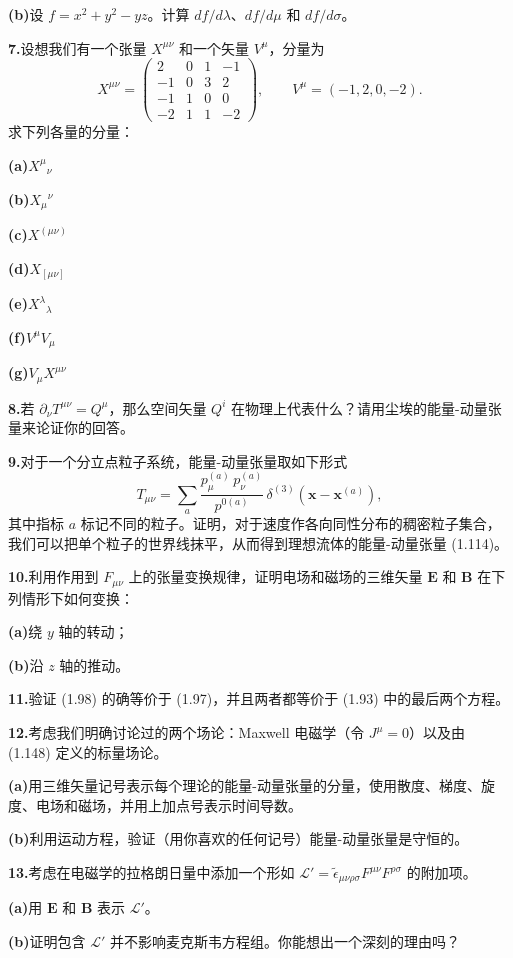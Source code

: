 \textbf{(b)}\quad 设 $f = x^{2}+y^{2}-yz$。计算 $df/d\lambda$、$df/d\mu$ 和 $df/d\sigma$。

\textbf{7.}\quad 设想我们有一个张量 $X^{\mu\nu}$ 和一个矢量 $V^{\mu}$，分量为
\begin{equation*}
X^{\mu\nu} =
\begin{pmatrix}
2 & 0 & 1 & -1\\
-1 & 0 & 3 & 2\\
-1 & 1 & 0 & 0\\
-2 & 1 & 1 & -2
\end{pmatrix},
\qquad
V^{\mu} = (-1, 2, 0, -2).
\end{equation*}
求下列各量的分量：

\textbf{(a)}\quad $X^{\mu}{}_{\nu}$

\textbf{(b)}\quad $X_{\mu}{}^{\nu}$

\textbf{(c)}\quad $X^{(\mu\nu)}$

\textbf{(d)}\quad $X_{[\mu\nu]}$

\textbf{(e)}\quad $X^{\lambda}{}_{\lambda}$

\textbf{(f)}\quad $V^{\mu}V_{\mu}$

\textbf{(g)}\quad $V_{\mu}X^{\mu\nu}$

\textbf{8.}\quad 若 $\partial_{\nu}T^{\mu\nu}=Q^{\mu}$，那么空间矢量 $Q^{i}$ 在物理上代表什么？请用尘埃的能量-动量张量来论证你的回答。

\textbf{9.}\quad 对于一个分立点粒子系统，能量-动量张量取如下形式
\begin{equation*}
T_{\mu\nu} = \sum_{a} \frac{p^{(a)}_{\mu}\,p^{(a)}_{\nu}}{p^{0(a)}}\,\delta^{(3)}(\mathbf{x}-\mathbf{x}^{(a)}),
\tag{1.173}
\end{equation*}
其中指标 $a$ 标记不同的粒子。证明，对于速度作各向同性分布的稠密粒子集合，我们可以把单个粒子的世界线抹平，从而得到理想流体的能量-动量张量 (1.114)。

\textbf{10.}\quad 利用作用到 $F_{\mu\nu}$ 上的张量变换规律，证明电场和磁场的三维矢量 $\mathbf{E}$ 和 $\mathbf{B}$ 在下列情形下如何变换：

\textbf{(a)}\quad 绕 $y$ 轴的转动；

\textbf{(b)}\quad 沿 $z$ 轴的推动。

\textbf{11.}\quad 验证 (1.98) 的确等价于 (1.97)，并且两者都等价于 (1.93) 中的最后两个方程。

\textbf{12.}\quad 考虑我们明确讨论过的两个场论：Maxwell 电磁学（令 $J^{\mu}=0$）以及由 (1.148) 定义的标量场论。

\textbf{(a)}\quad 用三维矢量记号表示每个理论的能量-动量张量的分量，使用散度、梯度、旋度、电场和磁场，并用上加点号表示时间导数。

\textbf{(b)}\quad 利用运动方程，验证（用你喜欢的任何记号）能量-动量张量是守恒的。

\textbf{13.}\quad 考虑在电磁学的拉格朗日量中添加一个形如 $\mathcal{L}' = \tilde{\epsilon}_{\mu\nu\rho\sigma}F^{\mu\nu}F^{\rho\sigma}$ 的附加项。

\textbf{(a)}\quad 用 $\mathbf{E}$ 和 $\mathbf{B}$ 表示 $\mathcal{L}'$。

\textbf{(b)}\quad 证明包含 $\mathcal{L}'$ 并不影响麦克斯韦方程组。你能想出一个深刻的理由吗？
